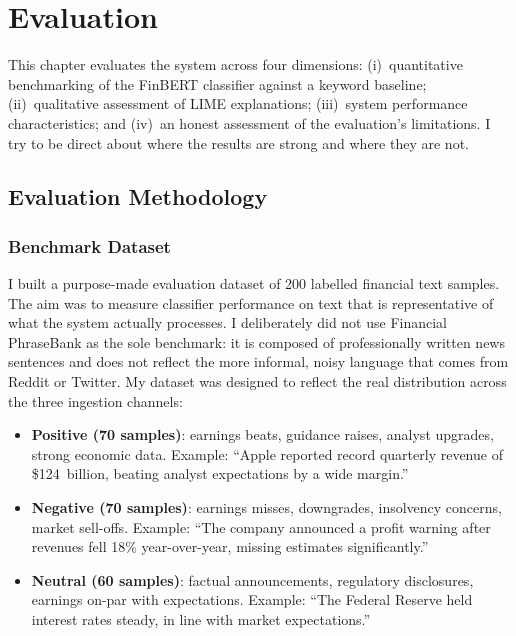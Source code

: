 \chapter{Evaluation}
\label{chap:evaluation}

This chapter evaluates the system across four dimensions: (i)~quantitative benchmarking of the FinBERT classifier against a keyword baseline; (ii)~qualitative assessment of LIME explanations; (iii)~system performance characteristics; and (iv)~an honest assessment of the evaluation's limitations. I try to be direct about where the results are strong and where they are not.

\section{Evaluation Methodology}
\label{sec:eval_methodology}

\subsection{Benchmark Dataset}

I built a purpose-made evaluation dataset of 200 labelled financial text samples. The aim was to measure classifier performance on text that is representative of what the system actually processes. I deliberately did not use Financial PhraseBank as the sole benchmark: it is composed of professionally written news sentences and does not reflect the more informal, noisy language that comes from Reddit or Twitter. My dataset was designed to reflect the real distribution across the three ingestion channels:

\begin{itemize}
    \item \textbf{Positive (70 samples)}: earnings beats, guidance raises, analyst upgrades, strong economic data.  Example: ``Apple reported record quarterly revenue of \$124~billion, beating analyst expectations by a wide margin.''
    \item \textbf{Negative (70 samples)}: earnings misses, downgrades, insolvency concerns, market sell-offs.  Example: ``The company announced a profit warning after revenues fell 18\% year-over-year, missing estimates significantly.''
    \item \textbf{Neutral (60 samples)}: factual announcements, regulatory disclosures, earnings on-par with expectations.  Example: ``The Federal Reserve held interest rates steady, in line with market expectations.''
\end{itemize}


